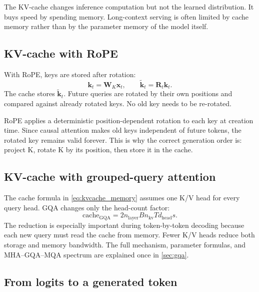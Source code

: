 \documentclass[11pt,a4paper]{article}
\theoremstyle{definition}
\theoremstyle{plain}
\newcommand{\vx}{\bm{x}}
\newcommand{\vk}{\bm{k}}
\newcommand{\mW}{\bm{W}}
\newcommand{\mR}{\bm{R}}
\newcommand{\dhead}{d_{\mathrm{head}}}
\newcommand{\nlayer}{n_{\mathrm{layer}}}
\begin{document}
\begin{tradeoffbox}
The KV-cache changes inference computation but not the learned distribution. It buys speed by spending memory. Long-context serving is often limited by cache memory rather than by the parameter memory of the model itself.
\end{tradeoffbox}

\subsection{KV-cache with RoPE}

With RoPE, keys are stored after rotation:
\begin{equation}
    \vk_t=\mW_K\vx_t,
    \qquad
    \widetilde{\vk}_t=\mR_t\vk_t.
\end{equation}
The cache stores $\widetilde{\vk}_t$. Future queries are rotated by their own positions and compared against already rotated keys. No old key needs to be re-rotated.

\begin{connectionbox}
RoPE applies a deterministic position-dependent rotation to each key at creation time. Since causal attention makes old keys independent of future tokens, the rotated key remains valid forever. This is why the correct generation order is: project K, rotate K by its position, then store it in the cache.
\end{connectionbox}

\subsection{KV-cache with grouped-query attention}

The cache formula in \cref{eq:kvcache_memory} assumes one K/V head for every query head. GQA changes only the head-count factor:
\begin{equation}
    \mathrm{cache}_{\mathrm{GQA}}
    =2\nlayer B n_{\mathrm{kv}}T\dhead s.
\end{equation}
The reduction is especially important during token-by-token decoding because each new query must read the cache from memory. Fewer K/V heads reduce both storage and memory bandwidth. The full mechanism, parameter formulas, and MHA--GQA--MQA spectrum are explained once in \cref{sec:gqa}.


\subsection{From logits to a generated token}
\end{document}
